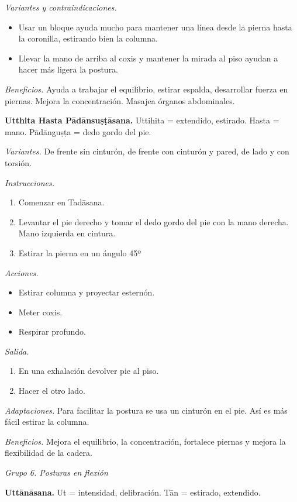 \emph{Variantes y contraindicaciones.}
\begin{itemize}
\item Usar un bloque ayuda mucho para
mantener una línea desde la pierna hasta la
coronilla, estirando bien la columna.
\item Llevar la mano de arriba al coxis y
mantener la mirada al piso ayudan a hacer más
ligera la postura.
\end{itemize}

\emph{Beneficios.} Ayuda a trabajar el
equilibrio, estirar espalda, desarrollar
fuerza en piernas. Mejora la concentración.
Masajea órganos abdominales.

\medskip\noindent\textbf{Utthita Hasta
Pādānsuṣṭāsana.}
Uttihita = extendido, estirado. Hasta = mano.
Pādānguṣṭa = dedo gordo del pie.

\emph{Variantes.} De frente sin cinturón, de
frente con cinturón y pared, de lado y con
torsión.

\emph{Instrucciones.}
\begin{enumerate}
\item Comenzar en Tadāsana.
\item Levantar el pie derecho y tomar el dedo
gordo del pie con la mano derecha. Mano
izquierda en cintura.
\item Estirar la pierna en un ángulo 45º
\end{enumerate}

\emph{Acciones.}
\begin{itemize}
\item Estirar columna y proyectar esternón.
\item Meter coxis.
\item Respirar profundo.
\end{itemize}

\emph{Salida.}
\begin{enumerate}
\item En una exhalación devolver pie al piso.
\item Hacer el otro lado.
\end{enumerate}

\emph{Adaptaciones.} Para facilitar la
postura se usa un cinturón en el pie. Así es
más fácil estirar la columna.

\emph{Beneficios.} Mejora el equilibrio, la
concentración, fortalece piernas y mejora la
flexibilidad de la cadera.

\medskip\noindent\emph{Grupo 6. Posturas en
flexión}

\medskip\noindent\textbf{Uttānāsana.}
Ut = intensidad, delibración. Tān = estirado,
extendido.

